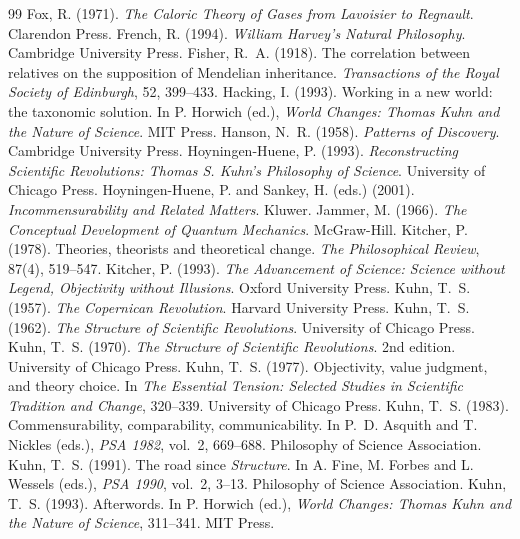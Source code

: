 \documentclass{situationist-preprint}
\begin{document}
\begin{thebibliography}{99}
 Fox, R. (1971). \emph{The Caloric Theory of Gases from Lavoisier to Regnault}. Clarendon Press.
 French, R. (1994). \emph{William Harvey's Natural Philosophy}. Cambridge University Press.
 Fisher, R.~A. (1918). The correlation between relatives on the supposition of Mendelian inheritance. \emph{Transactions of the Royal Society of Edinburgh}, 52, 399--433.
 Hacking, I. (1993). Working in a new world: the taxonomic solution. In P. Horwich (ed.), \emph{World Changes: Thomas Kuhn and the Nature of Science}. MIT Press.
 Hanson, N.~R. (1958). \emph{Patterns of Discovery}. Cambridge University Press.
 Hoyningen-Huene, P. (1993). \emph{Reconstructing Scientific Revolutions: Thomas S. Kuhn's Philosophy of Science}. University of Chicago Press.
 Hoyningen-Huene, P. and Sankey, H. (eds.) (2001). \emph{Incommensurability and Related Matters}. Kluwer.
 Jammer, M. (1966). \emph{The Conceptual Development of Quantum Mechanics}. McGraw-Hill.
 Kitcher, P. (1978). Theories, theorists and theoretical change. \emph{The Philosophical Review}, 87(4), 519--547.
 Kitcher, P. (1993). \emph{The Advancement of Science: Science without Legend, Objectivity without Illusions}. Oxford University Press.
 Kuhn, T.~S. (1957). \emph{The Copernican Revolution}. Harvard University Press.
 Kuhn, T.~S. (1962). \emph{The Structure of Scientific Revolutions}. University of Chicago Press.
 Kuhn, T.~S. (1970). \emph{The Structure of Scientific Revolutions}. 2nd edition. University of Chicago Press.
 Kuhn, T.~S. (1977). Objectivity, value judgment, and theory choice. In \emph{The Essential Tension: Selected Studies in Scientific Tradition and Change}, 320--339. University of Chicago Press.
 Kuhn, T.~S. (1983). Commensurability, comparability, communicability. In P.~D. Asquith and T. Nickles (eds.), \emph{PSA 1982}, vol.~2, 669--688. Philosophy of Science Association.
 Kuhn, T.~S. (1991). The road since \emph{Structure}. In A. Fine, M. Forbes and L. Wessels (eds.), \emph{PSA 1990}, vol.~2, 3--13. Philosophy of Science Association.
 Kuhn, T.~S. (1993). Afterwords. In P. Horwich (ed.), \emph{World Changes: Thomas Kuhn and the Nature of Science}, 311--341. MIT Press.

\end{thebibliography}
\end{document}
